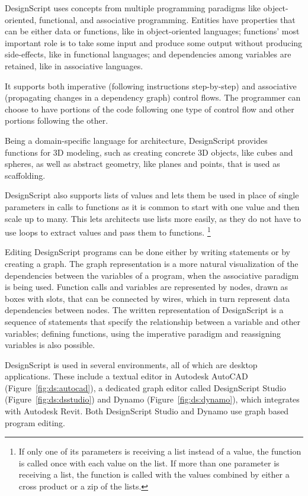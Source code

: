 DesignScript uses concepts from multiple programming paradigms like object-oriented, functional, and associative programming\cite{aish2012designscript}.
Entities have properties that can be either data or functions, like in object-oriented languages; functions' most important role is to take some input and produce some output without producing side-effects, like in functional languages; and dependencies among variables are retained, like in associative languages.

It supports both imperative (following instructions step-by-step) and associative (propagating changes in a dependency graph) control flows.
The programmer can choose to have portions of the code following one type of control flow and other portions following the other.

Being a domain-specific language for architecture, DesignScript provides functions for 3D modeling, such as creating concrete 3D objects, like cubes and spheres, as well as abstract geometry, like planes and points, that is used as scaffolding.

DesignScript also supports lists of values and lets them be used in place of single parameters in calls to functions as it is common to start with one value and then scale up to many.
This lets architects use lists more easily, as they do not have to use loops to extract values and pass them to functions.%
\footnote{If only one of its parameters is receiving a list instead of a value, the function is called once with each value on the list.
If more than one parameter is receiving a list, the function is called with the values combined by either a cross product or a zip of the lists.}

Editing DesignScript programs can be done either by writing statements or by creating a graph.
The graph representation is a more natural visualization of the dependencies between the variables of a program, when the associative paradigm is being used.
Function calls and variables are represented by nodes, drawn as boxes with slots, that can be connected by wires, which in turn represent data dependencies between nodes.
The written representation of DesignScript is a sequence of statements that specify the relationship between a variable and other variables; defining functions, using the imperative paradigm and reassigning variables is also possible.

DesignScript is used in several environments, all of which are desktop applications.
These include a textual editor in Autodesk AutoCAD (Figure~\ref{fig:ds:autocad}), a dedicated graph editor called DesignScript Studio (Figure~\ref{fig:ds:dsstudio}) and Dynamo (Figure~\ref{fig:ds:dynamo}), which integrates with Autodesk Revit.
Both DesignScript Studio and Dynamo use graph based program editing.

